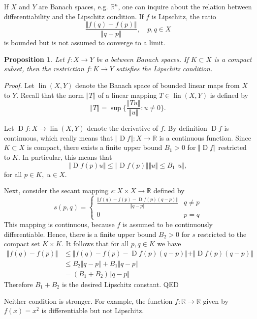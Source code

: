 \documentclass[12pt]{article}
\newcommand{\reals}{\mathbb{R}}
\newtheorem{proposition}{Proposition}
\newcommand{\lin}{\operatorname{lin}}
\newcommand{\Df}{{\operatorname{D}f}}
\begin{document}
If $X$ and $Y$ are Banach spaces, e.g. $\reals^n$, one can inquire about the relation
between differentiability and the Lipschitz condition.    If $f$ is Lipschitz, the ratio
$$\frac{ \Vert f(q)-f(p)\Vert}{\Vert q-p \Vert},\quad p,q\in X$$
is bounded but is not assumed to converge to a limit.

\begin{proposition}
  Let $f:X\to Y$ be a  between
  Banach spaces.  If $K\subset X$ is a compact
  subset, then the restriction $f:K\to Y$ satisfies the Lipschitz
  condition.
\end{proposition}
\emph{Proof.}
Let $\lin(X,Y)$ denote the Banach space of bounded linear maps from
$X$ to $Y$.  Recall that the norm $\Vert T\Vert$ of a linear mapping
$T\in\lin(X,Y)$ is defined by
$$\Vert T \Vert = \sup \{ \frac{\Vert Tu \Vert}{\Vert u\Vert} : u\neq 0\}.$$

Let $\Df:X\to \lin(X,Y)$ denote the derivative of $f$.  By definition
$\Df$ is continuous, which really means that
$\Vert \Df \Vert: X\to \reals$
is a continuous function.  Since
$K\subset X$ is compact, there exists a finite upper bound $B_1>0$ for
$\Vert \Df\Vert$ restricted to $K$.  In particular, this means that
$$\Vert \Df(p) u \Vert \leq \Vert \Df(p)\Vert \Vert u\Vert \leq B_1
\Vert u\Vert,$$
for all $p\in K,\; u\in X$.

Next, consider the secant mapping $s:X\times X\to\reals$ defined by
$$s(p,q) = 
\begin{cases}
  \displaystyle \frac{\Vert f(q) - f(p) - \Df(p)(q-p)\Vert}{\Vert q-p\Vert} & q\neq
  p \\
  0 & p=q
\end{cases}
$$
This mapping is continuous, because $f$ is assumed to be continuously
differentiable.  Hence, there is a finite
upper bound $B_2>0$ for $s$ restricted to the compact set $K\times K$.  It
follows that for all $p,q\in K$ we have
\begin{align*}
  \Vert f(q) - f(p) \Vert &\leq \Vert f(q) - f(p) -
  \Df(p)(q-p)\Vert  + \Vert \Df(p)(q-p)\Vert\\
  &\leq B_2 \Vert q-p\Vert +   B_1 \Vert q-p\Vert\\
  &= (B_1+B_2)\Vert q-p\Vert
\end{align*}
Therefore $B_1+ B_2$ is the desired Lipschitz constant.  QED

Neither condition is stronger. For example, the function $f:\reals \to \reals$
given by $f(x) = x^2$ is differentiable but not Lipschitz.
\end{document}
